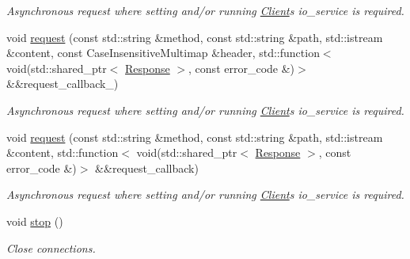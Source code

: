 \begin{DoxyCompactItemize}
\begin{DoxyCompactList}\small\item\em Asynchronous request where setting and/or running \hyperlink{classSimpleWeb_1_1Client}{Client}\textquotesingle{}s io\+\_\+service is required. \end{DoxyCompactList}\item 
void \hyperlink{classSimpleWeb_1_1ClientBase_a0c7e54ee77ba770b530917f72b49165e}{request} (const std\+::string \&method, const std\+::string \&path, std\+::istream \&content, const Case\+Insensitive\+Multimap \&header, std\+::function$<$ void(std\+::shared\+\_\+ptr$<$ \hyperlink{classSimpleWeb_1_1ClientBase_1_1Response}{Response} $>$, const error\+\_\+code \&)$>$ \&\&request\+\_\+callback\+\_\+)\hypertarget{classSimpleWeb_1_1ClientBase_a0c7e54ee77ba770b530917f72b49165e}{}\label{classSimpleWeb_1_1ClientBase_a0c7e54ee77ba770b530917f72b49165e}

\begin{DoxyCompactList}\small\item\em Asynchronous request where setting and/or running \hyperlink{classSimpleWeb_1_1Client}{Client}\textquotesingle{}s io\+\_\+service is required. \end{DoxyCompactList}\item 
void \hyperlink{classSimpleWeb_1_1ClientBase_a54b976ca2d8c7bda9b839d8de288f5a9}{request} (const std\+::string \&method, const std\+::string \&path, std\+::istream \&content, std\+::function$<$ void(std\+::shared\+\_\+ptr$<$ \hyperlink{classSimpleWeb_1_1ClientBase_1_1Response}{Response} $>$, const error\+\_\+code \&)$>$ \&\&request\+\_\+callback)\hypertarget{classSimpleWeb_1_1ClientBase_a54b976ca2d8c7bda9b839d8de288f5a9}{}\label{classSimpleWeb_1_1ClientBase_a54b976ca2d8c7bda9b839d8de288f5a9}

\begin{DoxyCompactList}\small\item\em Asynchronous request where setting and/or running \hyperlink{classSimpleWeb_1_1Client}{Client}\textquotesingle{}s io\+\_\+service is required. \end{DoxyCompactList}\item 
void \hyperlink{classSimpleWeb_1_1ClientBase_a820c98fa3dd368e9fa09cebdd79b2d61}{stop} ()\hypertarget{classSimpleWeb_1_1ClientBase_a820c98fa3dd368e9fa09cebdd79b2d61}{}\label{classSimpleWeb_1_1ClientBase_a820c98fa3dd368e9fa09cebdd79b2d61}

\begin{DoxyCompactList}\small\item\em Close connections. \end{DoxyCompactList}\end{DoxyCompactItemize}
